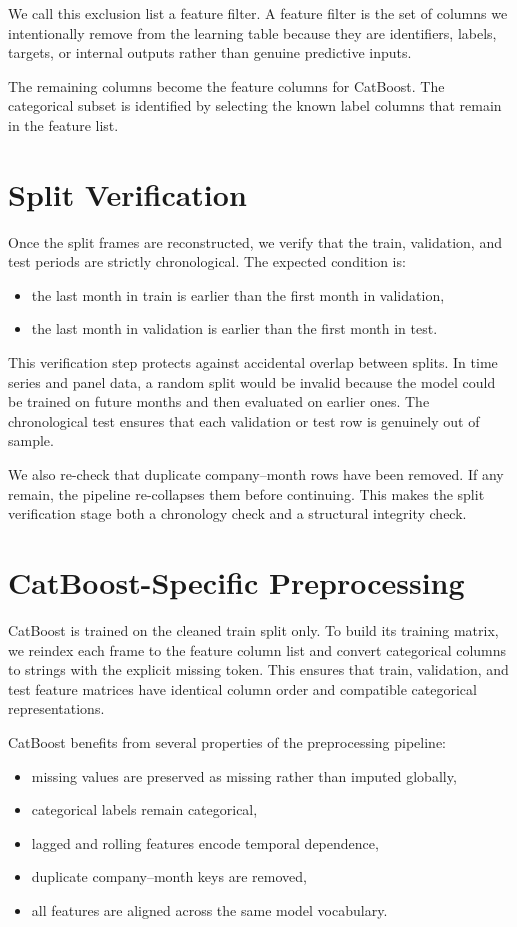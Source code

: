 \documentclass[11pt]{article}
\begin{document}
We call this exclusion list a feature filter. A feature filter is the set of columns we intentionally remove from the learning table because they are identifiers, labels, targets, or internal outputs rather than genuine predictive inputs.

The remaining columns become the feature columns for CatBoost. The categorical subset is identified by selecting the known label columns that remain in the feature list.

\section{Split Verification}

Once the split frames are reconstructed, we verify that the train, validation, and test periods are strictly chronological. The expected condition is:
\begin{itemize}
    \item the last month in train is earlier than the first month in validation,
    \item the last month in validation is earlier than the first month in test.
\end{itemize}

This verification step protects against accidental overlap between splits. In time series and panel data, a random split would be invalid because the model could be trained on future months and then evaluated on earlier ones. The chronological test ensures that each validation or test row is genuinely out of sample.

We also re-check that duplicate company--month rows have been removed. If any remain, the pipeline re-collapses them before continuing. This makes the split verification stage both a chronology check and a structural integrity check.

\section{CatBoost-Specific Preprocessing}

CatBoost is trained on the cleaned train split only. To build its training matrix, we reindex each frame to the feature column list and convert categorical columns to strings with the explicit missing token. This ensures that train, validation, and test feature matrices have identical column order and compatible categorical representations.

CatBoost benefits from several properties of the preprocessing pipeline:
\begin{itemize}
    \item missing values are preserved as missing rather than imputed globally,
    \item categorical labels remain categorical,
    \item lagged and rolling features encode temporal dependence,
    \item duplicate company--month keys are removed,
    \item all features are aligned across the same model vocabulary.
\end{itemize}
\end{document}
